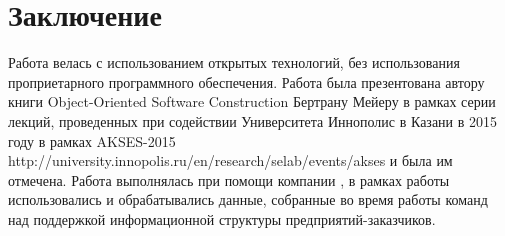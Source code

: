 \chapter*{Заключение}						%




Работа велась с использованием открытых технологий, без использования проприетарного программного обеспечения. Работа была презентована автору книги Object-Oriented Software Construction \cite{Meyer} Бертрану Мейеру в рамках серии лекций, проведенных при содействии Университета Иннополис в Казани в 2015 году в рамках AKSES-2015 http://university.innopolis.ru/en/research/selab/events/akses и была им отмечена.  
Работа выполнялась при помощи компании \icl, в рамках работы использовались и обрабатывались данные, собранные во время работы команд \icl над поддержкой информационной структуры предприятий-заказчиков.